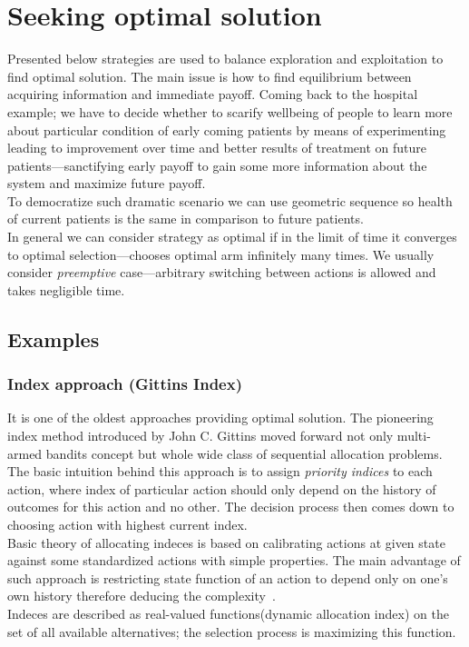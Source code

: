 \documentclass[12pt, a4paper, pdflatex, leqno]{report}
\begin{document}
\section{Seeking optimal solution}
Presented below strategies are used to balance exploration and exploitation to find optimal solution. The main issue is how to find equilibrium between acquiring information and immediate payoff. Coming back to the hospital example; we have to decide whether to scarify wellbeing of people to learn more about particular condition of early coming patients by means of experimenting leading to improvement over time and better results of treatment on future patients---sanctifying early payoff to gain some more information about the system and maximize future payoff.\\
To democratize such dramatic scenario we can use geometric sequence so health of current patients is the same in comparison to future patients.\\

In general we can consider strategy as optimal if in the limit of time it converges to optimal selection---chooses optimal arm infinitely many times. We usually consider \emph{preemptive} case---arbitrary switching between actions is allowed and takes negligible time.\\

\subsection{Examples}

\subsubsection{Index approach (Gittins Index)\label{sec:gitind}}
It is one of the oldest approaches providing optimal solution. The pioneering index method introduced by John C. Gittins moved forward not only multi-armed bandits concept but whole wide class of sequential allocation problems.\\

The basic intuition behind this approach is to assign \emph{priority indices} to each action, where index of particular action should only depend on the history of outcomes for this action and no other. The decision process then comes down to choosing action with highest current index.\\

Basic theory of allocating indeces is based on calibrating actions at given state against some standardized actions with simple properties. The main advantage of such approach is restricting state function of an action to depend only on one's own history therefore deducing the complexity~\citep{gittins+glazebrook+weber}.\\
Indeces are described as real-valued functions(dynamic allocation index) on the set of all available alternatives; the selection process is maximizing this function.\\
\end{document}
